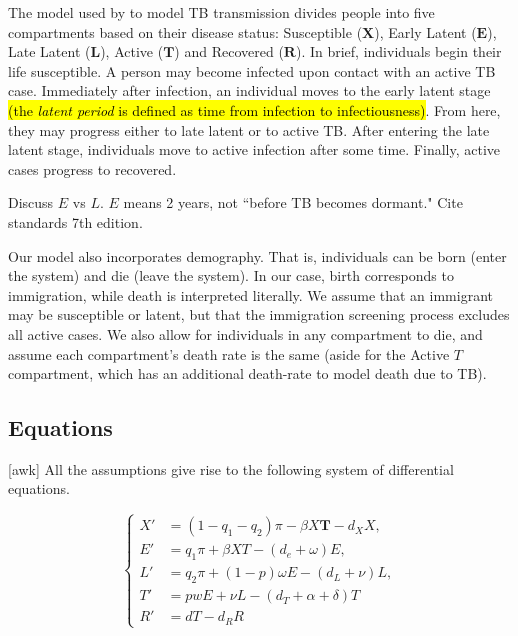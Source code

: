\documentclass[sn-mathphys,Numbered]{sn-jnl}%
\newcommand{\cX}{\mathbf{X}}
\newcommand{\cE}{\mathbf{E}}
\newcommand{\cL}{\mathbf{L}}
\newcommand{\cT}{\mathbf{T}}
\newcommand{\cR}{\mathbf{R}}
\theoremstyle{thmstyleone}%
\theoremstyle{thmstyletwo}%
\theoremstyle{thmstylethree}%
\begin{document}

The model used by \citeauthor{Guo2011PersistentLatency} to model TB transmission divides people into five compartments based on their disease status: Susceptible ($\cX$), Early Latent ($\cE$), Late Latent ($\cL$), Active ($\cT$) and Recovered ($\cR$). In brief, individuals begin their life susceptible. A person may become infected upon contact with an active TB case. Immediately after infection, an individual moves to the early latent stage \hl{(the \textit{latent period} is defined as time from infection to infectiousness\cite{InfectiousHandbook})}. From here, they may progress either to late latent or to active TB. After entering the late latent stage, individuals move to active infection after some time. Finally, active cases progress to recovered. 



Discuss $E$ vs $L$.  $E$ means 2 years, not ``before TB becomes dormant." Cite standards 7th edition.

Our model also incorporates demography. That is, individuals can be born (enter the system) and die (leave the system). In our case, birth corresponds to immigration, while death is interpreted literally. We assume that an immigrant may be susceptible or latent, but that the immigration screening process excludes all active cases. We also allow for individuals in any compartment to die, and assume each compartment's death rate is the same (aside for the Active $T$ compartment, which has an additional death-rate to model death due to TB).

\subsection{Equations}

[awk] All the assumptions give rise to the following system of differential equations.

\begin{equation}
    \begin{cases}
        X' &= (1-q_1-q_2)\pi - \beta X \cT - d_X X, \\
        E' &= q_1 \pi + \beta XT - (d_e+\omega)E,\\
        L' &= q_2 \pi + (1-p)\omega E - (d_L + \nu) L,\\
        T' &= pwE + \nu L -(d_T+\alpha+\delta) T \\
        R' &= dT - d_R R
    \end{cases}
    \label{eq:model}
\end{equation}
\end{document}
